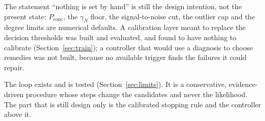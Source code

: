 \begin{caution}[title=What is still not true of the loop]
The statement ``nothing is set by hand'' is still the design intention, not the present state: $P_{\mathrm{conc}}$, the $\gamma_N$ floor, the signal-to-noise cut, the outlier cap and the degree limits are numerical defaults. A calibration layer meant to replace the decision thresholds was built and evaluated, and found to have nothing to calibrate (Section~\ref{sec:train}); a controller that would use a diagnosis to choose remedies was not built, because no available trigger finds the failures it could repair.
\end{caution}

\begin{takeaway}
The loop exists and is tested (Section~\ref{sec:limits}). It is a conservative, evidence-driven procedure whose steps change the candidates and never the likelihood. The part that is still design only is the calibrated stopping rule and the controller above it.
\end{takeaway}
